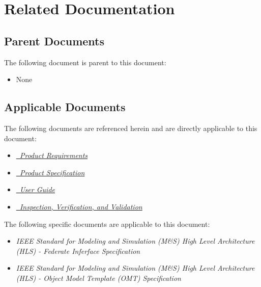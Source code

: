 \documentclass[twoside,11pt,titlepage]{report}
\begin{document}
\chapter{Related Documentation}

\section{Parent Documents}

The following document is parent to this document:
\begin{itemize}
\item{None}
\end{itemize}

\section{Applicable Documents}
The following documents are referenced herein and are directly
applicable to this document:

\begin{itemize}
\item{\href{file:TrickHLAReqt.pdf}
           {\em \TrickHLA\ Product Requirements}}
\cite{trickhlaenv:TrickHLAReqt}

\item{\href{file:TrickHLASpec.pdf}
           {\em \TrickHLA\ Product Specification}}
\cite{trickhlaenv:TrickHLASpec}

\item{\href{file:TrickHLAUser.pdf}
           {\em \TrickHLA\ User Guide}}
\cite{trickhlaenv:TrickHLAUser}

\item{\href{file:TrickHLAIVV.pdf}
           {\em \TrickHLA\ Inspection, Verification, and Validation}}
\cite{trickhlaenv:TrickHLAIVV}

\end{itemize}

The following specific documents are applicable to this document:

\begin{itemize}
\item{\em IEEE Standard for Modeling and Simulation (M\&S) High Level
          Architecture (HLS) - Federate Inferface Specification}
\cite{IEEE1516:API}

\item{\em IEEE Standard for Modeling and Simulation (M\&S) High Level
              Architecture (HLS) - Object Model Template (OMT) Specification}
\cite{IEEE1516:OMT}

\end{itemize}
\end{document}
